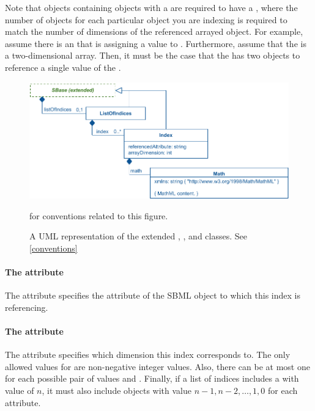 Note that \SBase objects containing   objects with a
\ListOfDimensions are required to have  a \ListOfIndices, where the number of
  \Index objects for each particular object you are indexing is required
  to match the number of dimensions of the referenced arrayed
  object. For example, assume there is an \AssignmentRule that is
  assigning a value to \Parameter. Furthermore, assume that
  the \Parameter is a two-dimensional array.  Then, it must be the case
  that the \Rule has two \Index objects to reference a single value of
  the \Parameter.
\begin{figure}[ht]
    \centering
    \includegraphics{images/indicesUML.pdf}
    \caption{A UML representation of the extended \SBase, \ListOfIndices, and \Index classes. See \ref{conventions}} for conventions related to this figure.
    \label{fig:indices_uml}
\end{figure}

\paragraph{The  attribute}

The  attribute specifies the attribute of the SBML object to which this index is referencing.

\paragraph{The  attribute}

The  attribute specifies which dimension this index corresponds to.
The only allowed values for  are
  non-negative integer values. Also, there can be at most one \Index for
  each possible pair of values
 and . Finally, if a list of indices includes a
\Index with  value of $n$, it must also
include \Index objects with value $n-1, n-2, \dots , 1, 0$ for each  attribute.

